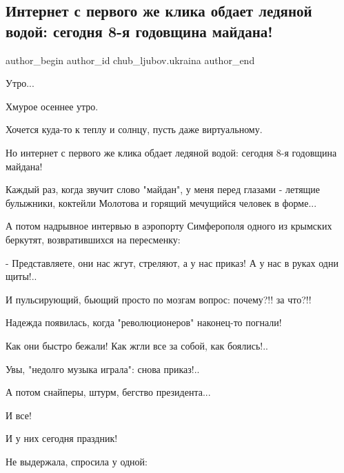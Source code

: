  
 
 
 
 
 
\subsection{Интернет с первого же клика обдает ледяной водой: сегодня 8-я годовщина майдана!}
\label{sec:21_11_2021.fb.chub_ljubov.ukraina.1.maidan_8_let}
 
\ifcmt
 author_begin
   author_id chub_ljubov.ukraina
 author_end
\fi

Утро...

Хмурое осеннее утро.

Хочется куда-то к теплу и солнцу, пусть даже виртуальному.

Но интернет с первого же клика обдает ледяной водой: сегодня 8-я годовщина
майдана!

Каждый раз, когда звучит слово "майдан", у меня перед глазами - летящие
булыжники, коктейли Молотова и горящий мечущийся человек в форме...

А потом надрывное  интервью в аэропорту Симферополя одного из крымских
беркутят, возвратившихся на пересменку:  

- Представляете, они нас жгут, стреляют, а у нас приказ! А у нас в руках одни
щиты!..

И пульсирующий, бьющий просто по мозгам вопрос: почему?!! за что?!!

Надежда появилась, когда "революционеров" наконец-то погнали! 

Как они быстро бежали! Как жгли все за собой, как боялись!..

Увы, "недолго музыка играла": снова приказ!.. 

А потом снайперы, штурм, бегство президента...

И все!

И у них сегодня праздник!

Не выдержала, спросила у одной: 

